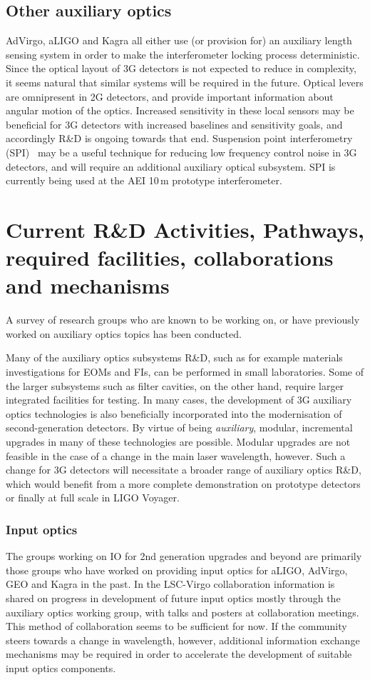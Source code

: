 \subsection{Other auxiliary optics}
AdVirgo, aLIGO and Kagra all either use (or provision for) an auxiliary length sensing system in order to make the interferometer locking process deterministic. Since the optical layout of 3G detectors is not expected to reduce in complexity, it seems natural that similar systems will be required in the future. Optical levers are  omnipresent in 2G detectors, and provide important information about angular motion of the optics. Increased sensitivity in these local sensors may be beneficial for 3G detectors with increased baselines and sensitivity goals, and accordingly R\&D is ongoing towards that end. Suspension point interferometry (SPI)~\cite{SPI} may be a useful technique for reducing low frequency control noise in 3G detectors, and will require an additional auxiliary optical subsystem. SPI is currently being used at the AEI 10\,m prototype interferometer.   

\section{Current R\&D Activities, Pathways, required facilities, collaborations\\ and mechanisms}
A survey of research groups who are known to be working on, or have previously worked on auxiliary optics topics has been conducted\cite{AuxActivitiesTable}.

Many of the auxiliary optics subsystems R\&D, such as for example materials investigations for EOMs and FIs, can be performed in small laboratories. 
Some of the larger subsystems such as filter cavities, on the other hand, require larger integrated facilities for testing. In many cases, the development of 3G auxiliary optics technologies is also beneficially incorporated into the modernisation of second-generation detectors. By virtue of being \emph{auxiliary}, modular, incremental upgrades in many of these technologies are possible. Modular upgrades are not feasible in the case of a change in the main laser wavelength, however. Such a change for 3G detectors will necessitate a broader range of auxiliary optics R\&D, which would benefit from a more complete demonstration on prototype detectors or finally at full scale in LIGO Voyager.

\subsubsection{\bf Input optics} The groups working on IO for 2nd generation upgrades and beyond are primarily those groups who have worked on providing input optics for aLIGO, AdVirgo, GEO and Kagra in the past. In the LSC-Virgo collaboration information is shared on progress in development of future input optics mostly through the auxiliary optics working group, with talks and posters at collaboration meetings. This method of collaboration seems to be sufficient for now. If the community steers towards a change in wavelength, however, additional information exchange mechanisms may be required in order to accelerate the development of suitable input optics components.

